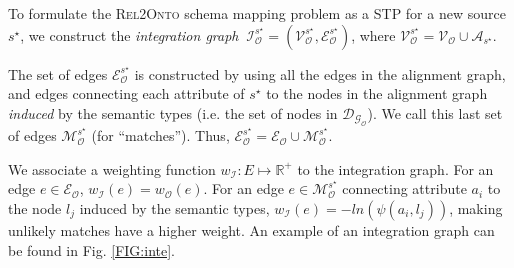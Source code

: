 \documentclass[letterpaper]{article} %
\newcommand{\authornote}[3]{
  {\fbox{\sc 
  #1}:$\blacktriangleright$\textcolor{#2}{\small{#3}}$\blacktriangleleft$}%
}
\newcommand{\ddg}[1]{\authornote{DDG}{blue}{#1}}
\newcommand{\relonto}{\textsc{Rel2Onto}}
\begin{document}
To formulate the \relonto{} schema mapping problem as a STP for a new source 
$s^\star$, we construct the 
\emph{integration graph} $~\mathcal{I}_\mathcal{O}^{s^\star} = 
(\mathcal{V}_\mathcal{O}^{s^\star},\mathcal{E}_\mathcal{O}^{s^\star})$, where  
$\mathcal{V}_\mathcal{O}^{s^\star} = \mathcal{V_O} \cup 
\mathcal{A}_{s^\star}$.

The set of edges $\mathcal{E}_\mathcal{O}^{s^\star}$ is constructed by using 
all the edges in the alignment 
graph, and edges connecting each attribute of $s^\star$ to the nodes in the 
alignment graph \emph{induced} by the semantic types (i.e. the set of nodes in 
$\mathcal{D_{G_O}}$). We call this last set 
of edges $\mathcal{M}_\mathcal{O}^{s^\star}$ (for ``matches''). Thus, 
$\mathcal{E}_\mathcal{O}^{s^\star} = 
\mathcal{E_O} \cup \mathcal{M}_\mathcal{O}^{s^\star}$.

We associate a weighting function  $w_\mathcal{I} : E \mapsto \mathbb{R}^+$ to 
the integration graph. 
For an edge $e \in \mathcal{E_O}$, $w_\mathcal{I}(e) = 
w_\mathcal{O}(e)$. For an edge $e 
\in \mathcal{M}_\mathcal{O}^{s^\star}$ connecting attribute $a_i$ to the node 
$l_j$ induced by the semantic types, $w_\mathcal{I}(e) = - 
ln(\psi(a_i,l_j))$, making unlikely matches have a higher weight. %
An example of an integration graph can be found in Fig. \ref{FIG:inte}.
\end{document}
